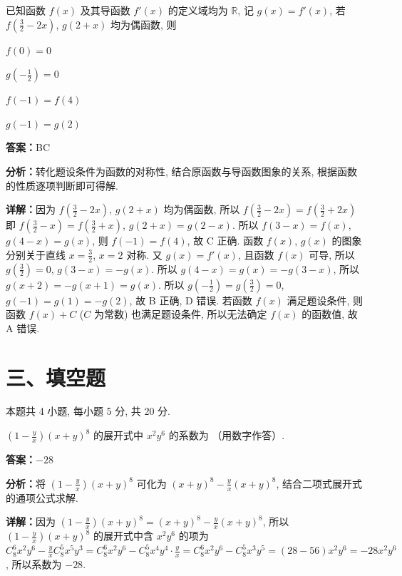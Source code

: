 \begin{question}[points=5]
已知函数 $f(x)$ 及其导函数 $f'(x)$ 的定义域均为 $\mathbb{R}$, 记 $g(x) = f'(x)$, 若 $f\left(\frac{3}{2} - 2x\right)$, $g(2 + x)$ 均为偶函数, 则
\begin{choices}
  \item $f(0) = 0$
  \item $g\left(-\frac{1}{2}\right) = 0$
  \item $f(-1) = f(4)$
  \item $g(-1) = g(2)$
\end{choices}
\begin{solution}
\textbf{答案：}BC

\textbf{分析：}转化题设条件为函数的对称性, 结合原函数与导函数图象的关系, 根据函数的性质逐项判断即可得解.

\textbf{详解：}因为 $f\left(\frac{3}{2} - 2x\right)$, $g(2 + x)$ 均为偶函数, 所以 $f\left(\frac{3}{2} - 2x\right) = f\left(\frac{3}{2} + 2x\right)$ 即 $f\left(\frac{3}{2} - x\right) = f\left(\frac{3}{2} + x\right)$, $g(2 + x) = g(2 - x)$. 所以 $f(3 - x) = f(x)$, $g(4 - x) = g(x)$, 则 $f(-1) = f(4)$, 故 C 正确. 函数 $f(x)$, $g(x)$ 的图象分别关于直线 $x = \frac{3}{2}$, $x = 2$ 对称. 又 $g(x) = f'(x)$, 且函数 $f(x)$ 可导, 所以 $g\left(\frac{3}{2}\right) = 0$, $g(3 - x) = -g(x)$. 所以 $g(4 - x) = g(x) = -g(3 - x)$, 所以 $g(x + 2) = -g(x + 1) = g(x)$. 所以 $g\left(-\frac{1}{2}\right) = g\left(\frac{3}{2}\right) = 0$, $g(-1) = g(1) = -g(2)$, 故 B 正确, D 错误. 若函数 $f(x)$ 满足题设条件, 则函数 $f(x) + C$ ($C$ 为常数) 也满足题设条件, 所以无法确定 $f(x)$ 的函数值, 故 A 错误.
\end{solution}
\end{question}

\section*{三、填空题}
本题共 4 小题, 每小题 5 分, 共 20 分.

\begin{question}[points=5]
$\left(1 - \frac{y}{x}\right)(x + y)^8$ 的展开式中 $x^2 y^6$ 的系数为 （用数字作答）.
\fillin[{$-28$}]
\begin{solution}
\textbf{答案：}$-28$

\textbf{分析：}将 $\left(1 - \frac{y}{x}\right)(x + y)^8$ 可化为 $(x + y)^8 - \frac{y}{x}(x + y)^8$, 结合二项式展开式的通项公式求解.

\textbf{详解：}因为 $\left(1 - \frac{y}{x}\right)(x + y)^8 = (x + y)^8 - \frac{y}{x}(x + y)^8$, 所以 $\left(1 - \frac{y}{x}\right)(x + y)^8$ 的展开式中含 $x^2 y^6$ 的项为 $C_8^6 x^2 y^6 - \frac{y}{x} C_8^5 x^5 y^3 = C_8^6 x^2 y^6 - C_8^5 x^4 y^4 \cdot \frac{y}{x} = C_8^6 x^2 y^6 - C_8^5 x^3 y^5 = (28 - 56) x^2 y^6 = -28 x^2 y^6$, 所以系数为 $-28$.
\end{solution}
\end{question}

